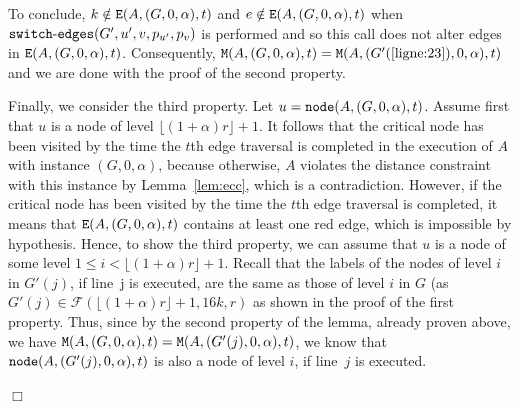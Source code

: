 \documentclass[11pt]{article}
\newcommand{\qed}{\hfill $\Box$ \bigbreak}
\newenvironment{proof}{\noindent {\bf Proof.}}{\qed}
\begin{document}
{\begin{proof}
\begin{itemize}
   To
   conclude, $k \notin {\tt E}(A,(G,0,\alpha),t)$ and $e \notin {\tt
     E}(A,(G,0,\alpha),t)$ when ${\tt
     switch\mbox{-}edges}(G',u',v,p_{u'},p_v)$ is performed and so
   this call does not alter edges in ${\tt E}(A,(G,0,\alpha),t)$. 
   Consequently, ${\tt M}(A,(G,0,\alpha),t)={\tt
     M}(A,(G'(\ref{ligne:23}),0,\alpha),t)$ and we are done with the
  proof of the second property.
\end{itemize}

  Finally, we consider the third property. Let $u = {\tt
    node}(A,(G,0,\alpha),t)$. Assume first that $u$ is a node of level
  $\lfloor(1+\alpha)r\rfloor+1$. It follows that the critical
  node has been visited by the time the $t$th edge traversal is completed in the execution of $A$ with instance $(G,0,\alpha)$, because otherwise, $A$ violates the distance constraint with this instance by Lemma~\ref{lem:ecc}, which is a contradiction. However, if the critical node has been visited by the time the $t$th edge traversal is completed, it means that ${\tt E}(A,(G,0,\alpha),t)$ contains at least one red edge, which is impossible by hypothesis.
Hence, to show the third property, we can assume that $u$ is a node of some level $1\leq i <
  \lfloor(1+\alpha)r\rfloor+1$. Recall that the labels of the nodes of level $i$ in $G'(j)$, if line~j is executed, are the same as those of level $i$ in $G$ (as $G'(j)\in\mathcal{F}(\lfloor(1+\alpha)r\rfloor+1,16k,r)$ as shown in the proof of the first property. Thus, since by the second property of the lemma, already proven above, we have ${\tt M}(A,(G,0,\alpha),t)={\tt M}(A,(G'(j),0,\alpha),t)$, we know that ${\tt node}(A,(G'(j),0,\alpha),t)$ is also a node of level $i$, if line~$j$ is executed.


\end{proof}}
\end{document}
